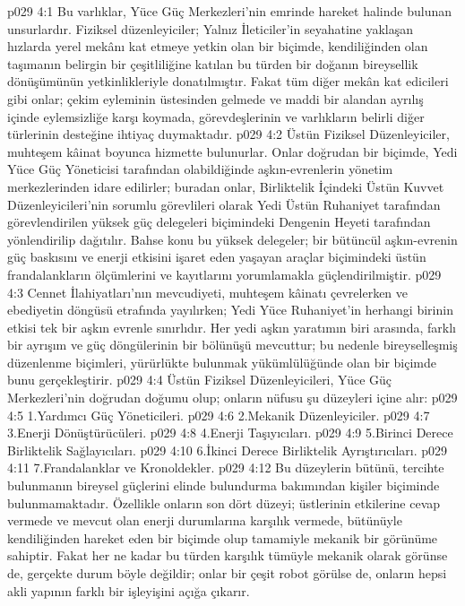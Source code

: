 \vs p029 4:1 Bu varlıklar, Yüce Güç Merkezleri’nin emrinde hareket halinde bulunan unsurlardır. Fiziksel düzenleyiciler; Yalnız İleticiler’in seyahatine yaklaşan hızlarda yerel mekânı kat etmeye yetkin olan bir biçimde, kendiliğinden olan taşımanın belirgin bir çeşitliliğine katılan bu türden bir doğanın bireysellik dönüşümünün yetkinlikleriyle donatılmıştır. Fakat tüm diğer mekân kat edicileri gibi onlar; çekim eyleminin üstesinden gelmede ve maddi bir alandan ayrılış içinde eylemsizliğe karşı koymada, görevdeşlerinin ve varlıkların belirli diğer türlerinin desteğine ihtiyaç duymaktadır.
\vs p029 4:2 Üstün Fiziksel Düzenleyiciler, muhteşem kâinat boyunca hizmette bulunurlar. Onlar doğrudan bir biçimde, Yedi Yüce Güç Yöneticisi tarafından olabildiğinde aşkın\hyp{}evrenlerin yönetim merkezlerinden idare edilirler; buradan onlar, Birliktelik İçindeki Üstün Kuvvet Düzenleyicileri’nin sorumlu görevlileri olarak Yedi Üstün Ruhaniyet tarafından görevlendirilen yüksek güç delegeleri biçimindeki Dengenin Heyeti tarafından yönlendirilip dağıtılır. Bahse konu bu yüksek delegeler; bir bütüncül aşkın\hyp{}evrenin güç baskısını ve enerji etkisini işaret eden yaşayan araçlar biçimindeki üstün frandalankların ölçümlerini ve kayıtlarını yorumlamakla güçlendirilmiştir.
\vs p029 4:3 Cennet İlahiyatları’nın mevcudiyeti, muhteşem kâinatı çevrelerken ve ebediyetin döngüsü etrafında yayılırken; Yedi Yüce Ruhaniyet’in herhangi birinin etkisi tek bir aşkın evrenle sınırlıdır. Her yedi aşkın yaratımın biri arasında, farklı bir ayrışım ve güç döngülerinin bir bölünüşü mevcuttur; bu nedenle bireyselleşmiş düzenlenme biçimleri, yürürlükte bulunmak yükümlülüğünde olan bir biçimde bunu gerçekleştirir.
\vs p029 4:4 Üstün Fiziksel Düzenleyicileri, Yüce Güç Merkezleri’nin doğrudan doğumu olup; onların nüfusu şu düzeyleri içine alır:
\vs p029 4:5 1.\bibnobreakspace Yardımcı Güç Yöneticileri.
\vs p029 4:6 2.\bibnobreakspace Mekanik Düzenleyiciler.
\vs p029 4:7 3.\bibnobreakspace Enerji Dönüştürücüleri.
\vs p029 4:8 4.\bibnobreakspace Enerji Taşıyıcıları.
\vs p029 4:9 5.\bibnobreakspace Birinci Derece Birliktelik Sağlayıcıları.
\vs p029 4:10 6.\bibnobreakspace İkinci Derece Birliktelik Ayrıştırıcıları.
\vs p029 4:11 7.\bibnobreakspace Frandalanklar ve Kronoldekler.
\vs p029 4:12 Bu düzeylerin bütünü, tercihte bulunmanın bireysel güçlerini elinde bulundurma bakımından kişiler biçiminde bulunmamaktadır. Özellikle onların son dört düzeyi; üstlerinin etkilerine cevap vermede ve mevcut olan enerji durumlarına karşılık vermede, bütünüyle kendiliğinden hareket eden bir biçimde olup tamamiyle mekanik bir görünüme sahiptir. Fakat her ne kadar bu türden karşılık tümüyle mekanik olarak görünse de, gerçekte durum böyle değildir; onlar bir çeşit robot görülse de, onların hepsi akli yapının farklı bir işleyişini açığa çıkarır.
